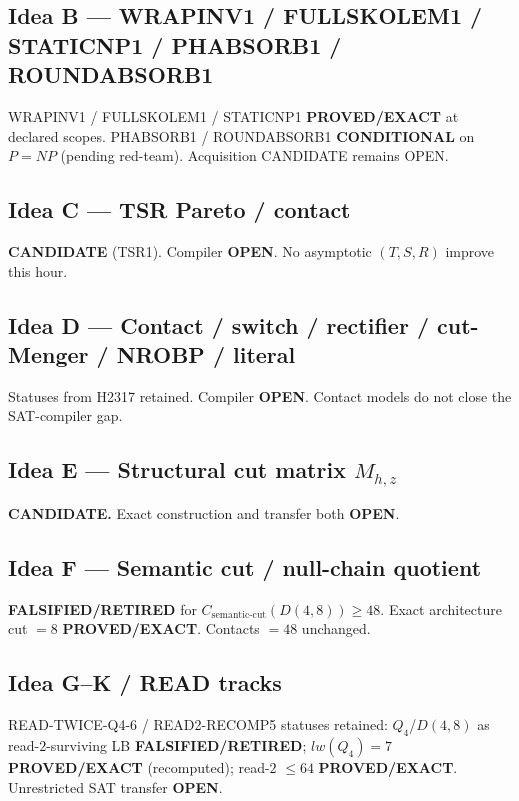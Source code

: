 \documentclass[11pt]{article}
\begin{document}
\subsection*{Idea B --- WRAPINV1 / FULLSKOLEM1 / STATICNP1 / PHABSORB1 / ROUNDABSORB1}
WRAPINV1 / FULLSKOLEM1 / STATICNP1 \textbf{PROVED/EXACT} at declared scopes.
PHABSORB1 / ROUNDABSORB1 \textbf{CONDITIONAL} on $P=NP$ (pending red-team). Acquisition CANDIDATE remains OPEN.

\subsection*{Idea C --- TSR Pareto / contact}
\textbf{CANDIDATE} (TSR1). Compiler \textbf{OPEN}. No asymptotic $(T,S,R)$ improve this hour.

\subsection*{Idea D --- Contact / switch / rectifier / cut-Menger / NROBP / literal}
Statuses from H2317 retained. Compiler \textbf{OPEN}. Contact models do not close the SAT-compiler gap.

\subsection*{Idea E --- Structural cut matrix $M_{h,z}$}
\textbf{CANDIDATE.} Exact construction and transfer both \textbf{OPEN}.

\subsection*{Idea F --- Semantic cut / null-chain quotient}
\textbf{FALSIFIED/RETIRED} for $C_{\mathrm{semantic\textrm{-}cut}}(D(4,8))\ge48$.
Exact architecture cut $=8$ \textbf{PROVED/EXACT}. Contacts $=48$ unchanged.

\subsection*{Idea G--K / READ tracks}
READ-TWICE-Q4-6 / READ2-RECOMP5 statuses retained: $Q_4$/$D(4,8)$ as read-$2$-surviving LB
\textbf{FALSIFIED/RETIRED}; $lw(Q_4)=7$ \textbf{PROVED/EXACT} (recomputed); read-$2$ $\le64$
\textbf{PROVED/EXACT}. Unrestricted SAT transfer \textbf{OPEN}.
\end{document}

